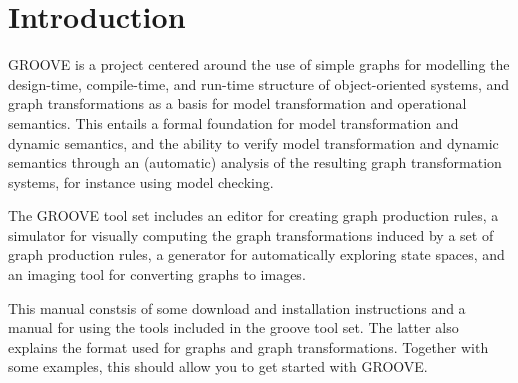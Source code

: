 \section{Introduction}

GROOVE is a project centered around the use of simple graphs for modelling the design-time, compile-time, and run-time structure of object-oriented systems, and graph transformations as a basis for model transformation and operational semantics. This entails a formal foundation for  model transformation and dynamic semantics, and the ability to verify model transformation and dynamic semantics through an (automatic) analysis of the resulting graph transformation systems, for instance using model checking.

The GROOVE tool set includes an editor for creating graph production rules, a simulator for visually computing the graph transformations
induced by a set of graph production rules, a generator for automatically exploring state spaces, and an imaging tool for converting graphs to images.

This manual constsis of some download and installation instructions and a manual for using the tools included in the groove tool set. The latter also explains the format used for graphs and graph transformations. Together with some examples, this should allow you to get started with GROOVE.